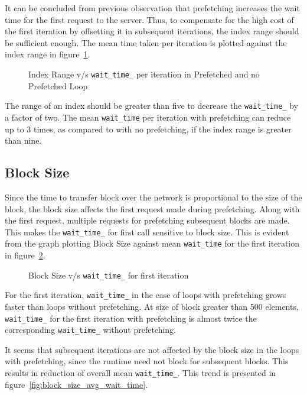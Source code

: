It can be concluded from previous observation that prefetching increases the wait time
for the first request to the server. Thus, to compensate for the high cost of the first
iteration by offsetting it in subsequent iterations, the index range
should be sufficient enough. The mean time taken per iteration is plotted against
the index range in figure~\ref{fig:p_np_mean}.

\begin{figure}[h]
  
  \caption{Index Range v/s \texttt{wait\_time\_} per iteration in Prefetched and no Prefetched Loop}
  \label{fig:p_np_mean}
\end{figure}

The range of an index should be greater than five to decrease the \texttt{wait\_time\_}
by a factor of two. The mean \texttt{wait\_time} per iteration with prefetching can
reduce up to 3 times, as compared to with no prefetching, if the index
range is greater than nine.

\subsection{Block Size}
Since the time to transfer block over the network is proportional to the size of the block, the
block size affects the first request made during prefetching. Along with the first
request, multiple requests for prefetching subsequent blocks are made. This makes
the \texttt{wait\_time\_} for first call sensitive to block size. This is evident
from the graph plotting Block Size against mean \texttt{wait\_time} for the first
iteration in figure~\ref{fig:first_wait_time}.
\begin{figure}[h]
  
  \caption{Block Size v/s \texttt{wait\_time\_} for first iteration}
  \label{fig:first_wait_time}
\end{figure}

For the first iteration, \texttt{wait\_time\_} in the case of loops with prefetching
grows faster than loops without prefetching. At size of block
greater than 500 elements, \texttt{wait\_time\_} for the first iteration with prefetching
is almost twice the corresponding \texttt{wait\_time\_} without prefetching.

It seems that subsequent iterations are not affected by the block size in the loops
with prefetching, since the runtime need not block for subsequent blocks. This results in reduction
of overall mean \texttt{wait\_time\_}. This trend is presented in figure~\ref{fig:block_size_avg_wait_time}.

